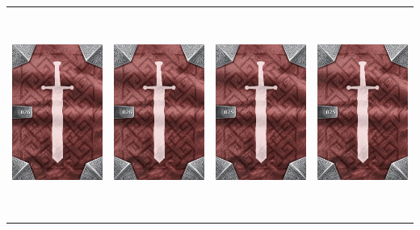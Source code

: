 \documentclass{minimal}
\begin{document}
{\begin{longtable}{llll}
\includegraphics[width=44mm,height=68mm]{./22-28/gh-026-long-spear-back.png} &
\includegraphics[width=44mm,height=68mm]{./22-28/gh-026-long-spear-back.png} &
\includegraphics[width=44mm,height=68mm]{./22-28/gh-025-jagged-sword-back.png} &
\includegraphics[width=44mm,height=68mm]{./22-28/gh-025-jagged-sword-back.png}\\ 

\end{longtable}}
\end{document}
